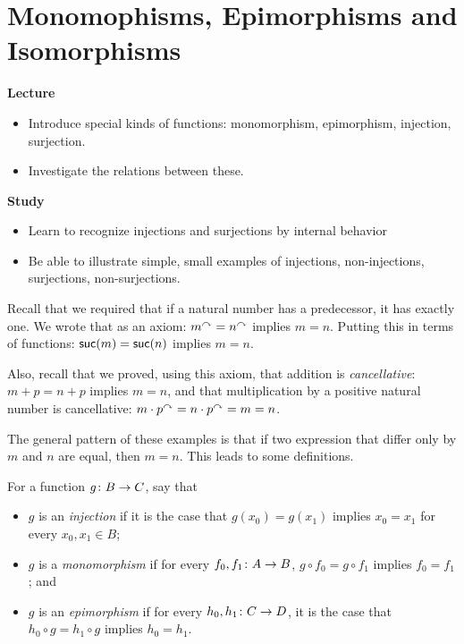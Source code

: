 \chapter{Monomophisms, Epimorphisms and Isomorphisms}

\begin{goals}
	\noindent\textbf{Lecture}
	\begin{itemize}
		\item Introduce special kinds of functions: monomorphism, epimorphism, injection, surjection.
		\item Investigate the relations between these.
	\end{itemize}
	
	\noindent\textbf{Study}
	\begin{itemize}
		\item Learn to recognize injections and surjections by internal behavior
		\item Be able to illustrate simple, small examples of injections, non-injections, surjections, non-surjections.
	\end{itemize}
\end{goals}

Recall that we required that if a natural number has a predecessor, it has exactly one. 
We wrote that as an axiom: $m^\curvearrowright = n^\curvearrowright$ implies $m=n$.
Putting this in terms of functions: $\mathord{\textsf{suc}}(m) = \mathord{\textsf{suc}}(n)$ implies $m=n$.

Also, recall that we proved, using this axiom, that addition is \emph{cancellative}: $m+p = n+p$
implies $m=n$, and that multiplication by a positive natural number is cancellative:
$m\cdot p^\curvearrowright = n\cdot p^\curvearrowright = m=n$.

The general pattern of these examples is that if two expression that differ only by $m$ and $n$ are equal, then $m=n$. This leads to some definitions.

\begin{defn}
	For a function ${g}\colon{B}\to{C}$, say that
	\begin{itemize}
		\item $g$ is an \emph{injection} if it is the case that $g(x_0)=g(x_1)$ implies $x_0=x_1$ for every $x_0,x_1\in B$;
		\item $g$ is a \emph{monomorphism} if for every ${f_0,f_1}\colon{A}\to{B}$, $g\circ f_0=g\circ f_1$ implies $f_0=f_1$; and
		\item $g$ is an \emph{epimorphism} if for every ${h_0,h_1}\colon{C}\to{D}$,
		it is the case that $h_0\circ g = h_1\circ g$ implies $h_0=h_1$.
	\end{itemize}  
\end{defn}

